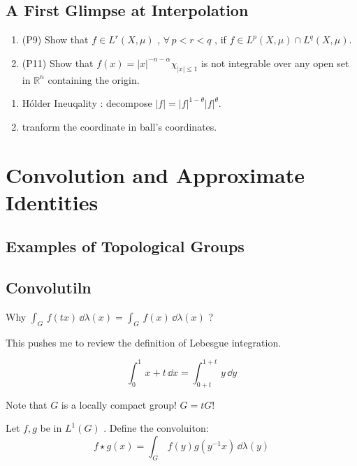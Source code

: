 \subsection{A First Glimpse at Interpolation}

\question

\begin{enumerate}
    \item (P9) Show that $f\in L^r(X,\mu)$ , $\forall \, p<r<q$ , if $f\in L^p(X,\mu)\cap L^q(X,\mu)$.
    \item (P11) Show that $f(x)=|x|^{-n-\alpha}\chi_{|x|\leq 1}$  is not integrable over any open set in $\mathbb{R}^n$ containing the origin.
\end{enumerate}

\solution

\begin{enumerate}
    \item H{\'o}lder Ineuqality : decompose $|f|=|f|^{1-\theta}|f|^{\theta}$.
    \item tranform the coordinate in ball's coordinates.
\end{enumerate}

\section{Convolution and Approximate Identities}

\subsection{Examples of Topological Groups}

\subsection{Convolutiln}

\question

Why $\int_G\,
f(tx) 
\,\dd \lambda(x)
=
\int_G\,
f(x)
\,\dd \lambda(x)
$
?
\par
This pushes me to review the definition of Lebesgue integration.
\begin{example*}
\begin{equation*}
\int_{0}^1\,
x+t
\,\dd x
=
\int_{0+t}^{1+t}\,
y
\, \dd y
\end{equation*}
\end{example*}

\solution
Note that $G$ is a locally compact group! $G=tG$!

\begin{definition*}[1.2.6 Convolution]
    Let $f,g$ be in $L^1(G)$ . Define the convoluiton:
    \begin{equation*}
        f\star g(x)
        =
        \int_G\,
        f(y)
        g(y^{-1}x)
        \,\dd \lambda (y)
    \end{equation*} 
\end{definition*}

